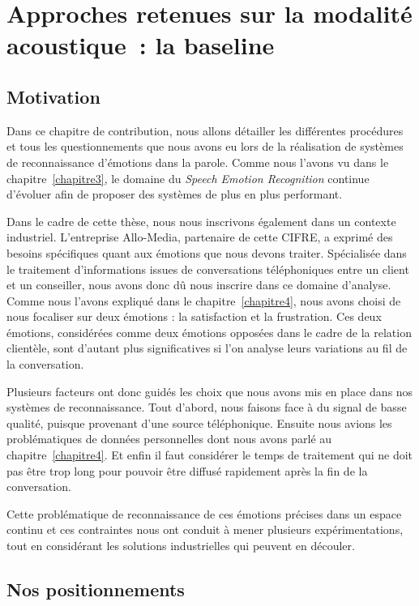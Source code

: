 \chapter{Approches retenues sur la modalité acoustique : la baseline}
\label{chapitre5}

\section{Motivation}
Dans ce chapitre de contribution, nous allons détailler les différentes procédures et tous les questionnements que nous avons eu lors de la réalisation de systèmes de reconnaissance d'émotions dans la parole.
Comme nous l'avons vu dans le chapitre~\ref{chapitre3}, le domaine du \textit{Speech Emotion Recognition} continue d'évoluer afin de proposer des systèmes de plus en plus performant.

Dans le cadre de cette thèse, nous nous inscrivons également dans un contexte industriel. L'entreprise Allo-Media, partenaire de cette CIFRE, a exprimé des besoins spécifiques quant aux émotions que nous devons traiter. Spécialisée dans le traitement d'informations issues de conversations téléphoniques entre un client et un conseiller, nous avons donc dû nous inscrire dans ce domaine d'analyse. Comme nous l'avons expliqué dans le chapitre~\ref{chapitre4}, nous avons choisi de nous focaliser sur deux émotions : la satisfaction et la frustration. Ces deux émotions, considérées comme deux émotions opposées dans le cadre de la relation clientèle, sont d'autant plus significatives si l'on analyse leurs variations au fil de la conversation.

Plusieurs facteurs ont donc guidés les choix que nous avons mis en place dans nos systèmes de reconnaissance. Tout d'abord, nous faisons face à du signal de basse qualité, puisque provenant d'une source téléphonique. Ensuite nous avions les problématiques de données personnelles dont nous avons parlé au chapitre~\ref{chapitre4}. Et enfin il faut considérer le temps de traitement qui ne doit pas être trop long pour pouvoir être diffusé rapidement après la fin de la conversation.

Cette problématique de reconnaissance de ces émotions précises dans un espace continu et ces contraintes nous ont conduit à mener plusieurs expérimentations, tout en considérant les solutions industrielles qui peuvent en découler.

\section{Nos positionnements}

